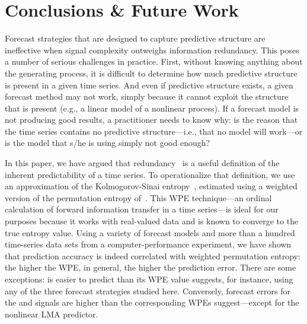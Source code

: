 \section{ Conclusions \& Future Work }\label{sec:conc}

Forecast strategies that are designed to capture predictive structure
are ineffective when signal complexity outweighs information
redundancy.  This poses a number of serious challenges in practice.
First, without knowing anything about the generating process, it is
difficult to determine how much predictive structure is present in a
given time series.  And even if predictive structure exists, a given
forecast method may not work, simply because it cannot exploit the
structure that is present (e.g., a linear model of a nonlinear
process).  If a forecast model is not producing good results, a
practitioner needs to know why: is the reason that the time series
contains no predictive structure---i.e., that no model will work---or
is the model that s/he is using simply not good enough?

In this paper, we have argued that redundancy~\cite{crutchfield2003}
is a useful definition of the inherent predictability of a time
series.  To operationalize that definition, we use an approximation of
the Kolmogorov-Sinai entropy~\cite{lind95}, estimated using a weighted
version of the permutation entropy of~\cite{bandt2002per}.  This WPE
technique---an ordinal calculation of forward information transfer in
a time series---is ideal for our purposes because it works with
real-valued data and is known to converge to the true entropy value.
Using a variety of forecast models and more than a hundred time-series
data sets from a computer-performance experiment, we have shown that
prediction accuracy is indeed correlated with weighted permutation
entropy: the higher the WPE, in general, the higher the prediction
error.  There are some exceptions: \svdone is easier to predict than
its WPE value suggests, for instance, using any of the three forecast
strategies studied here.  Conversely, forecast errors for the \col and
\svdfive signals are higher than the corresponding WPEs
suggest---except for the nonlinear LMA predictor.


